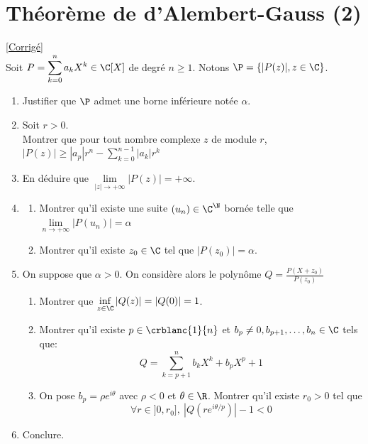\documentclass{book}
\begin{document}
	\section{Théorème de d'Alembert-Gauss (2) }
	\textcolor{blue}{\hyperref[sec:theoreme-de-dalembert-gauss-2]{[Corrigé]}}\\
	\label{alembertgauss2}
	\label{Théorème de d'Alembert-Gauss 2}
	Soit $P=\displaystyle\sum\limits_{k=0}^na_kX^k\in\C[X]$ de degré $n\geq 1$. Notons $\P=\left\{|P(z)|,z\in\C\right\}$.
	\begin{enumerate}
		\item Justifier que $\P$ admet une borne inférieure notée $\alpha$.
		\item Soit $r>0$.\\
		Montrer que pour tout nombre complexe $z$ de module $r$, $|P(z)|\geq|a_p|r^n-\displaystyle\sum\limits_{k=0}^{n-1} |a_k|r^k$
		\item En déduire que $\lim\limits_{|z|\to+\infty}|P(z)|=+\infty$.
		\item
		\begin{enumerate}[label=\alph*.]
			\item Montrer qu'il existe une suite $(u_n)\in \C^\N$ bornée telle que $\lim\limits_{n\to+\infty}|P(u_n)|=\alpha$
			\item Montrer qu'il existe $z_0\in \C$ tel que $|P(z_0)|=\alpha$.
		\end{enumerate}
		\item On suppose que $\alpha>0$. On considère alors le polynôme $Q=\displaystyle\frac{P(X+z_0)}{P(z_0)}$
		\begin{enumerate}[label=\alph*.]
			\item Montrer que $\inf\limits_{z\in\C}{|Q(z)|}=|Q(0)|=1$.
			\item Montrer qu'il existe $p\in\crblanc{1}{n}$ et $b_p\ne0,b_{p+1},\dots,b_n\in \C$ tels que: $$Q=\displaystyle\sum\limits_{k=p+1}^n b_kX^k+b_pX^p+1$$
			\item On pose $b_p=\rho e^{i\theta}$ avec $\rho<0$ et $\theta\in\R$. Montrer qu'il existe $r_0>0$ tel que $$\forall r\in ]0,r_0], \ |Q(re^{i\theta/p})|-1<0$$
		\end{enumerate}
		\item Conclure.
	\end{enumerate}
	
\end{document}

